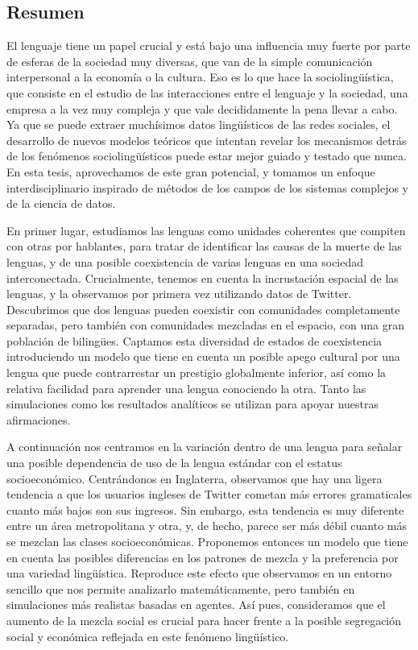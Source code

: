 \documentclass[../thesis.tex]{subfiles}
\begin{document}
\begin{es}
\chapter*{Resumen}
El lenguaje tiene un papel crucial y está bajo una influencia muy fuerte por parte de
esferas de la sociedad muy diversas, que van de la simple comunicación interpersonal a
la economía o la cultura. Eso es lo que hace la sociolingüística, que consiste en el
estudio de las interacciones entre el lenguaje y la sociedad, una empresa a la vez muy
compleja y que vale decididamente la pena llevar a cabo. Ya que se puede extraer
muchísimos datos lingüísticos de las redes sociales, el desarrollo de nuevos modelos
teóricos que intentan revelar los mecanismos detrás de los fenómenos sociolingüísticos
puede estar mejor guiado y testado que nunca. En esta tesis, aprovechamos de este gran
potencial, y tomamos un enfoque interdisciplinario inspirado de métodos de los campos de
los sistemas complejos y de la ciencia de datos.

En primer lugar, estudiamos las lenguas como unidades coherentes que compiten con otras
por hablantes, para tratar de identificar las causas de la muerte de las lenguas, y de
una posible coexistencia de varias lenguas en una sociedad interconectada. Crucialmente,
tenemos en cuenta la incrustación espacial de las lenguas, y la observamos por primera
vez utilizando datos de Twitter. Descubrimos que dos lenguas pueden coexistir con
comunidades completamente separadas, pero también con comunidades mezcladas en el
espacio, con una gran población de bilingües. Captamos esta diversidad de estados de
coexistencia introduciendo un modelo que tiene en cuenta un posible apego cultural por
una lengua que puede contrarrestar un prestigio globalmente inferior, así como la
relativa facilidad para aprender una lengua conociendo la otra. Tanto las simulaciones
como los resultados analíticos se utilizan para apoyar nuestras afirmaciones. 

A continuación nos centramos en la variación dentro de una lengua para señalar una
posible dependencia de uso de la lengua estándar con el estatus socioeconómico.
Centrándonos en Inglaterra, observamos que hay una ligera tendencia a que los usuarios
ingleses de Twitter cometan más errores gramaticales cuanto más bajos son sus ingresos.
Sin embargo, esta tendencia es muy diferente entre un área metropolitana y otra, y, de
hecho, parece ser más débil cuanto más se mezclan las clases socioeconómicas. Proponemos
entonces un modelo que tiene en cuenta las posibles diferencias en los patrones de
mezcla y la preferencia por una variedad lingüística. Reproduce este efecto que
observamos en un entorno sencillo que nos permite analizarlo matemáticamente, pero
también en simulaciones más realistas basadas en agentes. Así pues, consideramos que el
aumento de la mezcla social es crucial para hacer frente a la posible segregación social
y económica reflejada en este fenómeno lingüístico.


\end{es}
\end{document}
